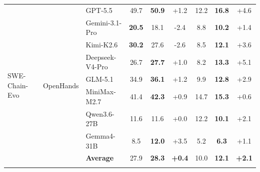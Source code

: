 \documentclass{article}
\begin{document}
\begin{table}[t]
{\begin{tabular}{lllcccccc}
\multirow{10}{*}{SWE-Chain-Evo}
& \multirow{10}{*}{OpenHands}
& GPT-5.5 & 49.7 & \textbf{50.9} & \textcolor{green!50!black}{+1.2} & 12.2 & \textbf{16.8} & \textcolor{green!50!black}{+4.6} \\
& & Gemini-3.1-Pro & \textbf{20.5} & 18.1 & \textcolor{red!50!black}{-2.4} & 8.8 & \textbf{10.2} & \textcolor{green!50!black}{+1.4} \\
& & Kimi-K2.6 & \textbf{30.2} & 27.6 & \textcolor{red!50!black}{-2.6} & 8.5 & \textbf{12.1} & \textcolor{green!50!black}{+3.6} \\
& & Deepseek-V4-Pro & 26.7 & \textbf{27.7} & \textcolor{green!50!black}{+1.0} & 8.2 & \textbf{13.3} & \textcolor{green!50!black}{+5.1} \\
& & GLM-5.1 & 34.9 & \textbf{36.1} & \textcolor{green!50!black}{+1.2} & 9.9 & \textbf{12.8} & \textcolor{green!50!black}{+2.9} \\
& & MiniMax-M2.7 & 41.4 & \textbf{42.3} & \textcolor{green!50!black}{+0.9} & 14.7 & \textbf{15.3} & \textcolor{green!50!black}{+0.6} \\
& & Qwen3.6-27B & 11.6 & 11.6 & \textcolor{green!50!black}{+0.0} & 12.2 & \textbf{10.1} & \textcolor{green!50!black}{+2.1} \\
& & Gemma4-31B & 8.5 & \textbf{12.0} & \textcolor{green!50!black}{+3.5} & 5.2 & \textbf{6.3} & \textcolor{green!50!black}{+1.1} \\
\cmidrule(l){3-9}
& & \textbf{Average} & 27.9 & \textbf{28.3} & \textcolor{green!50!black}{\textbf{+0.4}} & 10.0 & \textbf{12.1} & \textcolor{green!50!black}{\textbf{+2.1}} \\
\cmidrule(l){1-9}



\end{tabular}}
\end{table}
\end{document}
